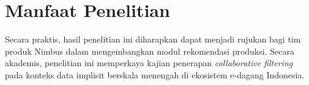 \section{Manfaat Penelitian}
Secara praktis, hasil penelitian ini diharapkan dapat menjadi rujukan bagi
tim produk Nimbus dalam mengembangkan modul rekomendasi produksi. Secara
akademis, penelitian ini memperkaya kajian penerapan \emph{collaborative
filtering} pada konteks data implisit berskala menengah di ekosistem
e-dagang Indonesia.
